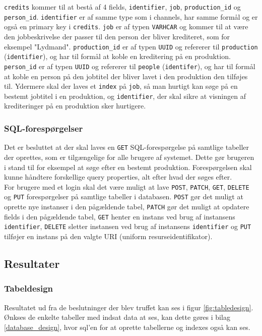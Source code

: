 \texttt{credits} kommer til at bestå af 4 fields, \texttt{identifier}, \texttt{job}, \texttt{production\_id} og \texttt{person\_id}. \texttt{identifier} er af samme type som i channels, har samme formål og er også en primary key i \texttt{credits}. \texttt{job} er af typen \texttt{VARHCAR} og kommer til at være den jobbeskrivelse der passer til den person der bliver krediteret, som for eksempel "Lydmand". \texttt{production\_id} er af typen \texttt{UUID} og refererer til \texttt{production} (\texttt{identifier}), og har til formål at koble en kreditering på en produktion. \texttt{person\_id} er af typen \texttt{UUID} og refererer til  \texttt{people} (\texttt{identifer}), og har til formål at koble en person på den jobtitel der bliver lavet i den produktion den tilføjes til. Ydermere skal der laves et \texttt{index} på \texttt{job}, så man hurtigt kan søge på en bestemt jobtitel i en produktion, og \texttt{identifier}, der skal sikre at visningen af krediteringer på en produktion sker hurtigere.

\subsubsection{SQL-forespørgelser}
Det er besluttet at der skal laves en \texttt{GET} SQL-forespørgelse på samtlige tabeller der oprettes, som er tilgængelige for alle brugere af systemet. Dette gør brugeren i stand til for eksempel at søge efter en bestemt produktion. Forespørgelsen skal kunne håndtere forskellige query properties, alt efter hvad der søges efter.\\


For brugere med et login skal det være muligt at lave \texttt{POST}, \texttt{PATCH}, \texttt{GET}, \texttt{DELETE} og \texttt{PUT} forespørgelser på samtlige tabeller i databasen. \texttt{POST} gør det muligt at oprette nye instanser i den pågældende tabel, \texttt{PATCH} gør det muligt at opdatere fields i den pågældende tabel, \texttt{GET} henter en instans ved brug af instansens \texttt{identifier}, \texttt{DELETE} sletter instansen ved brug af instansens \texttt{identifier} og \texttt{PUT} tilføjer en instans på den valgte URI (uniform resurseidentifikator).

\subsection{Resultater}
\subsubsection{Tabeldesign}
Resultatet ud fra de beslutninger der blev truffet kan ses i figur \ref{fig:tabledesign}. Ønkses de enkelte tabeller med indsat data at ses, kan dette gøres i bilag \ref{database_design}, hvor sql'en for at oprette tabellerne og indexes også kan ses.

